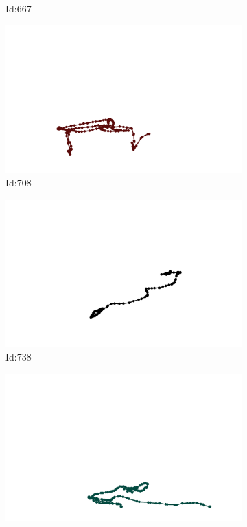\documentclass[12pt,twoside]{report}
\begin{document}
\begin{figure}
\begin{subfigure}[b]{0.20\textwidth}
\caption{Id:667}
\end{subfigure}
\begin{subfigure}[b]{0.20\textwidth}
\centering
\includegraphics[width=\textwidth]{../trajectories/708.png}
\caption{Id:708}
\end{subfigure}
\begin{subfigure}[b]{0.20\textwidth}
\centering
\includegraphics[width=\textwidth]{../trajectories/738.png}
\caption{Id:738}
\end{subfigure}
\begin{subfigure}[b]{0.20\textwidth}
\centering
\includegraphics[width=\textwidth]{../trajectories/839.png}

\end{subfigure}
\end{figure}
\end{document}
